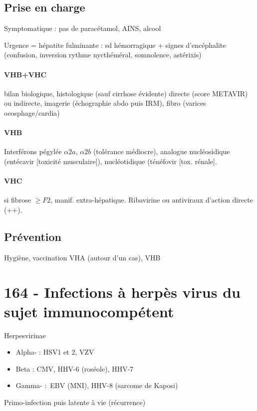 \subsection{Prise en charge}
Symptomatique : pas de paracétamol, AINS, alcool

Urgence = hépatite fulminante  : sd hémorragique + signes d'encéphalite
(confusion, inversion rythme nycthéméral, somnolence, astérixis)

\paragraph{VHB+VHC} bilan biologique, histologique (sauf cirrhose évidente)
directe (score METAVIR) ou indirecte, imagerie (échographie abdo puis IRM),
fibro (varices oeosphage/cardia)

\paragraph{VHB} Interférons pégylée $\alpha{}2a$, $\alpha{}2b$ (tolérance
médiocre), analogue nucléosidique (entécavir [toxicité musculaire]), nucléotidique (ténéfovir
[tox. rénale].

\paragraph{VHC} si fibrose $\ge F2$, manif. extra-hépatique. Ribavirine ou
antiviraux d'action directe (++).

\subsection{Prévention}
Hygiène, vaccination VHA (autour d'un cas), VHB

\section{164 - Infections à herpès virus du sujet immunocompétent}
\label{sec:item164}

Herpesvirinae

\begin{itemize}
\tightlist
\item
  Alpha- : HSV1 et 2, VZV
\item
  Beta : CMV, HHV-6 (roséole), HHV-7
\item
  Gamma- :~EBV (MNI), HHV-8 (sarcome de Kaposi)
\end{itemize}

Primo-infection puis latente à vie (récurrence)

